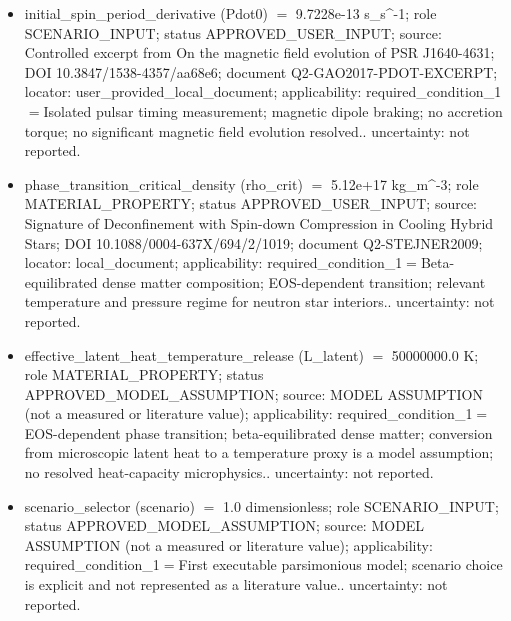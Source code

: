 \documentclass[11pt]{article}
\begin{document}
\begin{itemize}
\item initial\_\allowbreak{}spin\_\allowbreak{}period\_\allowbreak{}derivative (Pdot0) \ensuremath{=} 9.7228e-13 s\_\allowbreak{}s\textasciicircum{}-1; role SCENARIO\_\allowbreak{}INPUT; status APPROVED\_\allowbreak{}USER\_\allowbreak{}INPUT; source: Controlled excerpt from On the magnetic field evolution of PSR J1640-4631; DOI 10.3847/\allowbreak{}1538-4357/\allowbreak{}aa68e6; document Q2-GAO2017-PDOT-EXCERPT; locator: user\_\allowbreak{}provided\_\allowbreak{}local\_\allowbreak{}document; applicability: required\_\allowbreak{}condition\_\allowbreak{}1\ensuremath{=}Isolated pulsar timing measurement; magnetic dipole braking; no accretion torque; no significant magnetic field evolution resolved.. uncertainty: not reported.
\item phase\_\allowbreak{}transition\_\allowbreak{}critical\_\allowbreak{}density (rho\_\allowbreak{}crit) \ensuremath{=} 5.12e+17 kg\_\allowbreak{}m\textasciicircum{}-3; role MATERIAL\_\allowbreak{}PROPERTY; status APPROVED\_\allowbreak{}USER\_\allowbreak{}INPUT; source: Signature of Deconfinement with Spin-down Compression in Cooling Hybrid Stars; DOI 10.1088/\allowbreak{}0004-637X/\allowbreak{}694/\allowbreak{}2/\allowbreak{}1019; document Q2-STEJNER2009; locator: local\_\allowbreak{}document; applicability: required\_\allowbreak{}condition\_\allowbreak{}1\ensuremath{=}Beta-equilibrated dense matter composition; EOS-dependent transition; relevant temperature and pressure regime for neutron star interiors.. uncertainty: not reported.
\item effective\_\allowbreak{}latent\_\allowbreak{}heat\_\allowbreak{}temperature\_\allowbreak{}release (L\_\allowbreak{}latent) \ensuremath{=} 50000000.0 K; role MATERIAL\_\allowbreak{}PROPERTY; status APPROVED\_\allowbreak{}MODEL\_\allowbreak{}ASSUMPTION; source: MODEL ASSUMPTION (not a measured or literature value); applicability: required\_\allowbreak{}condition\_\allowbreak{}1\ensuremath{=}EOS-dependent phase transition; beta-equilibrated dense matter; conversion from microscopic latent heat to a temperature proxy is a model assumption; no resolved heat-capacity microphysics.. uncertainty: not reported.
\item scenario\_\allowbreak{}selector (scenario) \ensuremath{=} 1.0 dimensionless; role SCENARIO\_\allowbreak{}INPUT; status APPROVED\_\allowbreak{}MODEL\_\allowbreak{}ASSUMPTION; source: MODEL ASSUMPTION (not a measured or literature value); applicability: required\_\allowbreak{}condition\_\allowbreak{}1\ensuremath{=}First executable parsimonious model; scenario choice is explicit and not represented as a literature value.. uncertainty: not reported.

\end{itemize}
\end{document}
